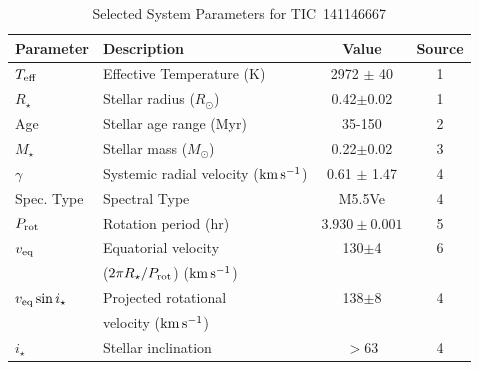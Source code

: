 \documentclass{nature3}
\newcommand{\kms}{\ensuremath{\rm km\,s^{-1}}}
\begin{document}
\begin{table}
\scriptsize
\setlength{\tabcolsep}{2pt}
\centering
\caption{Selected System Parameters for TIC~141146667}
\label{tab:params}
\begin{tabular}{llcc}
\hline \hline
Parameter & Description & Value & Source\\
\hline 
%
$T_{\rm eff}$\dotfill                   & Effective Temperature (K) \hspace{9pt}\dotfill                 & 2972 $\pm$ 40    & 1 \\
%
%
$R_\star$\dotfill                       & Stellar radius ($R_\odot$)\dotfill                             & 0.42$\pm$0.02    & 1 \\
%
Age                                     & Stellar age range (Myr)\dotfill                                & 35-150  & 2 \\
%
$M_\star$\dotfill                       & Stellar mass ($M_\odot$)\dotfill                               & 0.22$\pm$0.02  & 3 \\
%
$\gamma$\dotfill                        & Systemic radial velocity (\kms)\dotfill                        & 0.61 $\pm$ 1.47  & 4 \\
%
Spec. Type\dotfill                      & Spectral Type\dotfill                                          & M5.5Ve           & 4 \\
%
$P_{\rm rot}$\dotfill                   & Rotation period (hr)\dotfill                                   & $3.930\pm 0.001$ & 5 \\
%
$v_{\rm eq}$\dotfill		                & Equatorial velocity \dotfill                                   &  130$\pm$4       & 6 \\
                                        & \hspace{3pt} ($2\pi R_\star/P_{\rm rot}$) (\kms)	             &                      \\
%
$v_{\rm eq}\sin{i_\star}$\dotfill		    & Projected rotational\dotfill                                   &  138$\pm$8       & 4 \\
                                        & \hspace{3pt} velocity (\kms)	                                 &                      \\
%
$i_\star$\dotfill                       & Stellar inclination\dotfill                                    & 	$>$63           & 4 \\

\end{tabular}
\end{table}
\end{document}

